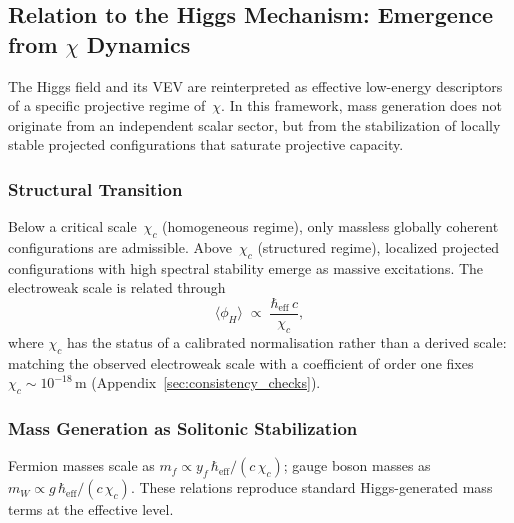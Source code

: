 \subsection{Relation to the Higgs Mechanism: Emergence from \texorpdfstring{$\chi$}{χ} Dynamics}
  \label{subsec:relation-to-the-higgs-mechanism}

  The Higgs field and its VEV are reinterpreted as effective low-energy
  descriptors of a specific projective regime of~$\chi$.
  In this framework, mass generation does not originate from an
  independent scalar sector, but from the stabilization of locally
  stable projected configurations that saturate projective capacity.

  \subsubsection*{Structural Transition}
    \label{subsec:emergence-higgs-vev}
    \label{subsec:chi_c-electroweak-scale}

    Below a critical scale~$\chi_c$ (homogeneous regime), only massless
    globally coherent configurations are admissible.
    Above~$\chi_c$ (structured regime), localized projected configurations
    with high spectral stability emerge as massive excitations.
    The electroweak scale is related through
    \begin{equation}
      \langle \phi_H \rangle
      \;\propto\;
      \frac{\hbar_{\mathrm{eff}}\, c}{\chi_c},
    \end{equation}
    where $\chi_c$ has the status of a calibrated normalisation rather than a derived scale:
    matching the observed electroweak scale with a coefficient of order one fixes
    $\chi_c \sim 10^{-18}\,\mathrm{m}$ (Appendix~\ref{sec:consistency_checks}).

  \subsubsection*{Mass Generation as Solitonic Stabilization}
    \label{subsec:mass-generation-solitons}

    Fermion masses scale as
    $m_f \propto y_f\,\hbar_{\mathrm{eff}}/(c\,\chi_c)$;
    gauge boson masses as
    $m_W \propto g\,\hbar_{\mathrm{eff}}/(c\,\chi_c)$.
    These relations reproduce standard Higgs-generated mass terms at the effective level.

